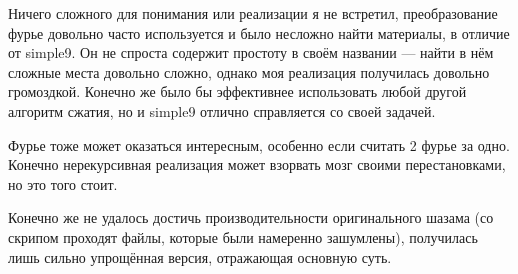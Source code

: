 \documentclass[12pt]{article}
\begin{document}
Ничего сложного для понимания или реализации я не встретил, преобразование фурье довольно
часто используется и было несложно найти материалы, в отличие от simple9. Он не спроста
содержит простоту в своём названии --- найти в нём сложные места довольно сложно, однако
моя реализация получилась довольно громоздкой. Конечно же было бы эффективнее использовать
любой другой алгоритм сжатия, но и simple9 отлично справляется со своей задачей.

Фурье тоже может оказаться интересным, особенно если считать 2 фурье за одно. Конечно
нерекурсивная реализация может взорвать мозг своими перестановками, но это того стоит.

Конечно же не удалось достичь производительности оригинального шазама (со скрипом проходят файлы, которые были намеренно зашумлены), получилась лишь
сильно упрощённая версия, отражающая основную суть.
\end{document}
